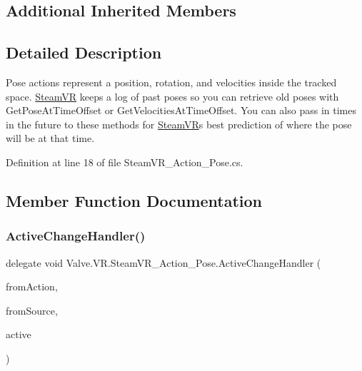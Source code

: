 \subsection*{Additional Inherited Members}


\subsection{Detailed Description}
Pose actions represent a position, rotation, and velocities inside the tracked space. \mbox{\hyperlink{class_valve_1_1_v_r_1_1_steam_v_r}{Steam\+VR}} keeps a log of past poses so you can retrieve old poses with Get\+Pose\+At\+Time\+Offset or Get\+Velocities\+At\+Time\+Offset. You can also pass in times in the future to these methods for \mbox{\hyperlink{class_valve_1_1_v_r_1_1_steam_v_r}{Steam\+VR}}\textquotesingle{}s best prediction of where the pose will be at that time. 



Definition at line 18 of file Steam\+V\+R\+\_\+\+Action\+\_\+\+Pose.\+cs.



\subsection{Member Function Documentation}
\mbox{\label{class_valve_1_1_v_r_1_1_steam_v_r___action___pose_a3861a4b4b8ce246db2cc77e632a7f999}} 
\subsubsection{\texorpdfstring{ActiveChangeHandler()}{ActiveChangeHandler()}}
{\footnotesize\ttfamily delegate void Valve.\+V\+R.\+Steam\+V\+R\+\_\+\+Action\+\_\+\+Pose.\+Active\+Change\+Handler (\begin{DoxyParamCaption}\item[{\mbox{\hyperlink{class_valve_1_1_v_r_1_1_steam_v_r___action___pose}{Steam\+V\+R\+\_\+\+Action\+\_\+\+Pose}}}]{from\+Action,  }\item[{\mbox{\hyperlink{namespace_valve_1_1_v_r_a82e5bf501cc3aa155444ee3f0662853f}{Steam\+V\+R\+\_\+\+Input\+\_\+\+Sources}}}]{from\+Source,  }\item[{bool}]{active }\end{DoxyParamCaption})}

